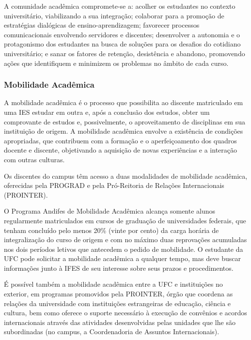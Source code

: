 
A comunidade acadêmica compromete-se a: acolher os estudantes no contexto universitário, viabilizando a sua integração; colaborar para a promoção de estratégias dialógicas de ensino-aprendizagem; favorecer processos comunicacionais envolvendo servidores e discentes; desenvolver a autonomia e o protagonismo dos estudantes na busca de soluções para os desafios do cotidiano universitário; e sanar os fatores de retenção, desistência e abandono, promovendo ações que identifiquem e minimizem os problemas no âmbito de cada curso.

\subsubsection{Mobilidade Acadêmica}

A mobilidade acadêmica é o processo que possibilita ao discente matriculado em uma IES estudar em outra e, após a conclusão dos estudos, obter um comprovante de estudos e, possivelmente, o aproveitamento de disciplinas em sua instituição de origem.
A mobilidade acadêmica envolve a existência de condições apropriadas, que contribuem com a formação e o aperfeiçoamento dos quadros docente e discente, objetivando a aquisição de novas experiências e a interação com outras culturas.

Os discentes do campus têm acesso a duas modalidades de mobilidade acadêmica, oferecidas pela PROGRAD e pela Pró-Reitoria de Relações Internacionais (PROINTER).

O Programa Andifes de Mobilidade Acadêmica alcança somente alunos regularmente matriculados em cursos de graduação de universidades federais, que tenham concluído pelo menos 20\% (vinte por cento) da carga horária de integralização do curso de origem e com no máximo duas reprovações acumuladas nos dois períodos letivos que antecedem o pedido de mobilidade. O estudante da UFC pode solicitar a mobilidade acadêmica a qualquer tempo, mas deve buscar informações junto à IFES de seu interesse sobre seus prazos e procedimentos.

É possível também a mobilidade acadêmica entre a UFC e instituições no exterior, em programas promovidos pela PROINTER, órgão que coordena as relações da universidade com instituições estrangeiras de educação, ciência e cultura, bem como oferece o suporte necessário à execução de convênios e acordos internacionais através das atividades desenvolvidas pelas unidades que lhe são subordinadas (no campus, a Coordenadoria de Assuntos Internacionais).

